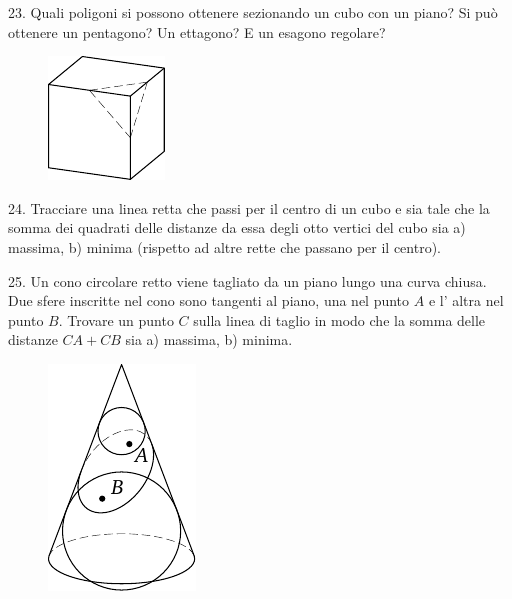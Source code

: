 \begin{problem}{23.}
	Quali poligoni si possono ottenere sezionando un cubo con un piano? Si può ottenere un pentagono? Un ettagono? E un esagono regolare?
	\begin{figure}
		\includegraphics{resources/taskbook-7}
	\end{figure}
\end{problem}

\begin{problem}{24.}
	Tracciare una linea retta che passi per il centro di un cubo e sia tale che la somma dei quadrati delle distanze da essa degli otto vertici del cubo sia a) massima, b) minima (rispetto ad altre rette che  passano per il centro).
\end{problem}

\begin{problem}{25.}
	Un cono circolare retto viene tagliato da un piano lungo una curva chiusa. Due sfere inscritte nel cono sono tangenti al piano, una nel punto $A$ e l’ altra nel punto $B$. Trovare un punto $C$ sulla linea di taglio in modo che la somma delle distanze $CA + CB$ sia a) massima, b) minima.
	\begin{figure}
		\includegraphics{resources/taskbook-9}
	\end{figure}
\end{problem}

